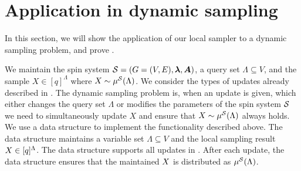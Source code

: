 \section{Application in dynamic sampling}\label{sec:dynamic}

In this section, we will show the application of our local sampler to a dynamic sampling problem, and prove .


We maintain the spin system $\mathcal{S}=(G=(V,E),\bm{\lambda},\bm{A})$, a query set $\Lambda\subseteq V$, and the sample $X\in [q]^{\Lambda}$ where $X\sim \mu^{\mathcal{S}}(\Lambda)$. We consider the types of updates already described in . The dynamic sampling problem is, when an update is given, which either changes the query set $\Lambda$ or modifies the parameters of the spin system $\mathcal{S}$ we need to simultaneously update $X$ and ensure that $X \sim \mu^{\mathcal{S}}(\Lambda)$ always holds.
We use a data structure to implement the functionality described above. The data structure maintains a variable set $\Lambda\subseteq V$ and the local sampling result $X \in [q]^{\Lambda}$. 
The data structure supports all updates in . After each update, the data structure ensures that the maintained $X$ is distributed as $\mu^{\mathcal{S}}(\Lambda)$. 

